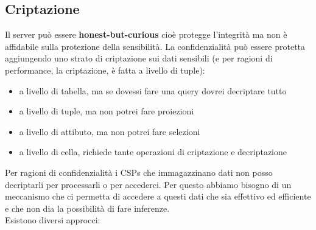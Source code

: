 \subsection{Criptazione}
Il server può essere \textbf{honest-but-curious} cioè protegge l'integrità ma non è affidabile sulla protezione della sensibilità. La confidenzialità può essere protetta aggiungendo uno strato di criptazione sui dati sensibili (e per ragioni di performance, la criptazione, è fatta a livello di tuple):
\begin{itemize}
    \item a livello di tabella, ma se dovessi fare una query dovrei decriptare tutto
    \item a livello di tuple, ma non potrei fare proiezioni
    \item a livello di attibuto, ma non potrei fare selezioni
    \item a livello di cella, richiede tante operazioni  di criptazione e decriptazione
\end{itemize}
Per ragioni di confidenzialità i CSPs che immagazzinano dati non posso decriptarli per processarli o per accederci. Per questo abbiamo bisogno di un meccanismo che ci permetta di accedere a questi dati che sia effettivo ed efficiente e che non dia la possibilità di fare inferenze.\\
Esistono diversi approcci:
